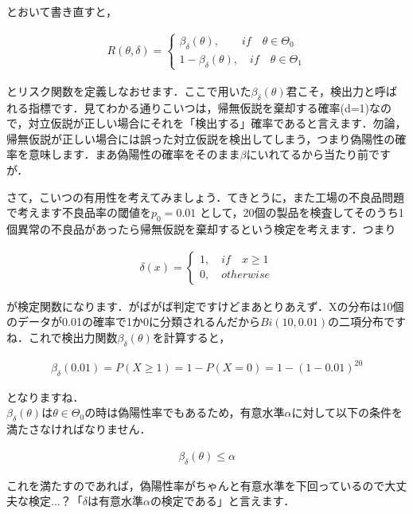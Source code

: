 \documentclass[11pt,a4paper,uplatex]{ujreport} 	%
\begin{document}
とおいて書き直すと，

\begin{align}
  R(\theta, \delta) = 
  \left\{
    \begin{array}{l}
    \beta_\delta(\theta), \qquad if \quad \theta \in \Theta_0\\
    1-\beta_\delta(\theta), \quad if \quad \theta \in \Theta_1
    \end{array}
  \right.
  \label{eq:risk2}
\end{align}

とリスク関数を定義しなおせます．ここで用いた$\beta_\delta(\theta)$君こそ，検出力と呼ばれる指標です．見てわかる通りこいつは，帰無仮説を棄却する確率(d=1)なので，対立仮説が正しい場合にそれを「検出する」確率であると言えます．勿論，帰無仮説が正しい場合には誤った対立仮説を検出してしまう，つまり偽陽性の確率を意味します．まあ偽陽性の確率をそのまま$\beta$にいれてるから当たり前ですが．

さて，こいつの有用性を考えてみましょう．てきとうに，また工場の不良品問題で考えます不良品率の閾値を$p_0=0.01$
として，20個の製品を検査してそのうち1個異常の不良品があったら帰無仮説を棄却するという検定を考えます．つまり

\begin{align}
  \delta(x) = 
  \left\{
    \begin{array}{l}
    1, \quad if \quad  x \geq 1\\
    0, \quad otherwise
    \end{array}
  \right.
\end{align}

が検定関数になります．がばがば判定ですけどまあとりあえず．Xの分布は10個のデータが0.01の確率で1か0に分類されるんだから$Bi(10,0.01)$の二項分布ですね．これで検出力関数$\beta_\delta(\theta)$を計算すると，

\begin{align}
  \beta_\delta(0.01) = P(X \geq 1) = 1-P(X=0) = 1-(1-0.01)^{20}
  \label{eq:size}
\end{align}

となりますね．\\

$\beta_\delta(\theta)$は$\theta \in \Theta_0$の時は偽陽性率でもあるため，有意水準$\alpha$に対して以下の条件を満たさなければなりません．

\begin{align}
  \beta_\delta(\theta) \leq \alpha
  \label{eq:power}
\end{align}

これを満たすのであれば，偽陽性率がちゃんと有意水準を下回っているので大丈夫な検定...？「$\delta$は有意水準$\alpha$の検定である」と言えます．\\
\end{document}

